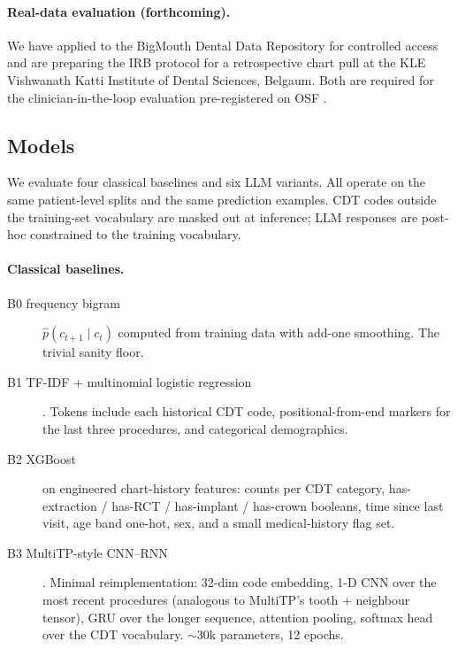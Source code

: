 \documentclass[preprint,authoryear,1p,12pt]{elsarticle}
\begin{document}
\paragraph{Real-data evaluation (forthcoming).} We have applied to the
BigMouth Dental Data Repository
\citep{walji2014bigmouth,walji2022bigmouth} for controlled access and are
preparing the IRB protocol for a retrospective chart pull at the KLE
Vishwanath Katti Institute of Dental Sciences, Belgaum. Both are required
for the clinician-in-the-loop evaluation pre-registered on OSF
\citep{munafo2017manifesto,nosek2018preregistration}.

\subsection{Models}
\label{sec:models}

We evaluate four classical baselines and six LLM variants. All operate on
the same patient-level splits and the same prediction examples. CDT
codes outside the training-set vocabulary are masked out at inference;
LLM responses are post-hoc constrained to the training vocabulary.

\paragraph{Classical baselines.}

\begin{description}
    \item[B0 frequency bigram] \(\hat{p}(c_{t+1} \mid c_t)\) computed
      from training data with add-one smoothing. The trivial sanity
      floor.
    \item[B1 TF-IDF + multinomial logistic regression] \citep{salton1988tfidf,
      pedregosa2011scikit}. Tokens include each historical CDT code,
      positional-from-end markers for the last three procedures, and
      categorical demographics.
    \item[B2 XGBoost] \citep{chen2016xgboost} on engineered chart-history
      features: counts per CDT category, has-extraction / has-RCT /
      has-implant / has-crown booleans, time since last visit, age band
      one-hot, sex, and a small medical-history flag set.
    \item[B3 MultiTP-style CNN--RNN] \citep{chen2024multitp}. Minimal
      reimplementation: 32-dim code embedding, 1-D CNN over the most
      recent procedures (analogous to MultiTP's tooth + neighbour
      tensor), GRU over the longer sequence, attention pooling, softmax
      head over the CDT vocabulary. \(\sim\)30k parameters, 12 epochs.
\end{description}
\end{document}
